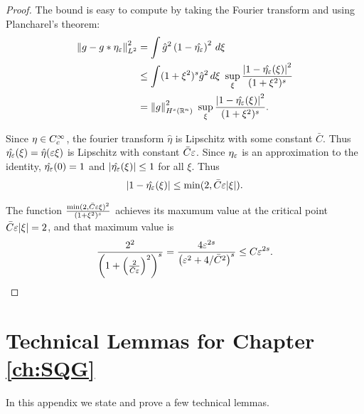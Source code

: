 \begin{proof}
The bound is easy to compute by taking the Fourier transform and using Plancharel's theorem:
\begin{align*} 
\left\lVert g - g\ast \eta_\varepsilon\right\rVert_{L^2}^2 &= \int \hat{g}^2 \left( 1 - \hat{\eta_\varepsilon} \right)^2 \,d\xi 
\\ &\leq \int (1+\xi^2)^s \hat{g}^2 \,d\xi \,\, \sup_{\xi} \frac{\left\lvert 1-\hat{\eta_\varepsilon}(\xi) \right\rvert^2}{(1+\xi^2)^s}
\\ &= \left\lVert g\right\rVert_{H^s(\mathbb{R}^n)}^2 \,\, \sup_{\xi} \frac{\left\lvert 1-\hat{\eta_\varepsilon}(\xi) \right\rvert^2}{(1+\xi^2)^s}.
\end{align*}

Since $\eta \in C_c^\infty$, the fourier transform $\hat{\eta}$ is Lipschitz with some constant $\bar{C}$. Thus $\hat{\eta_\varepsilon}(\xi) = \hat{\eta}(\varepsilon \xi)$ is Lipschitz with constant $\bar{C}\varepsilon$.  Since $\eta_\varepsilon$ is an approximation to the identity, $\hat{\eta_\varepsilon}(0) = 1$ and $\left\lvert \hat{\eta_\varepsilon}(\xi) \right\rvert \leq 1$ for all $\xi$.  Thus
\[ \left\lvert 1 - \hat{\eta_\varepsilon}(\xi) \right\rvert \leq \min(2,\bar{C}\varepsilon|\xi|). \]
%

The function $\frac{\min(2,\bar{C}\varepsilon\xi)^2}{(1+\xi^2)^s}$ achieves its maxumum value at the critical point $\bar{C}\varepsilon|\xi| = 2$, and that maximum value is 
\[ \frac{2^2}{\left( 1+\left( \frac{2}{\bar{C}\varepsilon} \right)^2 \right)^s} = \frac{4 \varepsilon^{2s}}{\left( \varepsilon^2 + 4/\bar{C}^2 \right)^s} \leq C \varepsilon^{2s}. \]
\end{proof}




\section{Technical Lemmas for Chapter \ref{ch:SQG}} \label{sec:technical}

In this appendix we state and prove a few technical lemmas.  

